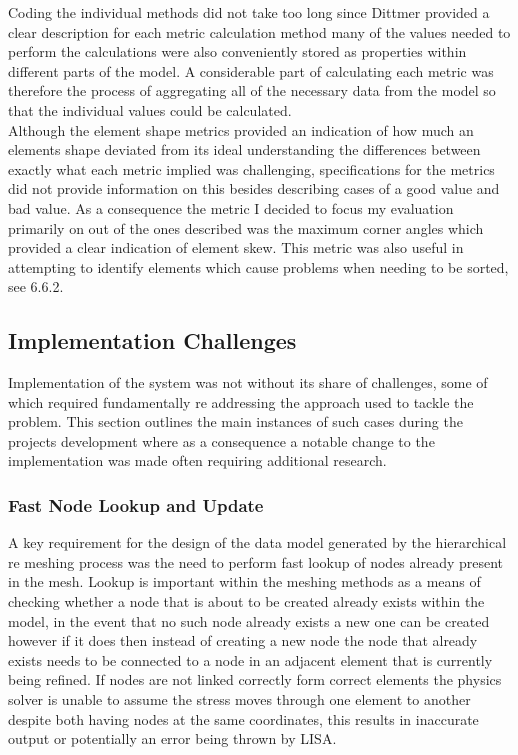 \noindent
Coding the individual methods did not take too long since Dittmer provided a clear description for each metric calculation method many of the values needed to perform the calculations were also conveniently stored as properties within different parts of the model. A considerable part of calculating each metric was therefore the process of aggregating all of the necessary data from the model so that the individual values could be calculated. \\ 

\noindent
Although the element shape metrics provided an indication of how much an elements shape deviated from its ideal understanding the differences between exactly what each metric implied was challenging, specifications for the metrics did not provide information on this besides describing cases of a good value and bad value. As a consequence the metric I decided to focus my evaluation primarily on out of the ones described was the maximum corner angles which provided a clear indication of element skew. This metric was also useful in attempting to identify elements which cause problems when needing to be sorted, see 6.6.2.




\subsection{Implementation Challenges}
Implementation of the system was not without its share of challenges, some of which required fundamentally re addressing the approach used to tackle the problem. This section outlines the main instances of such cases during the projects development where as a consequence a notable change to the implementation was made often requiring additional research.

\subsubsection{Fast Node Lookup and Update}
A key requirement for the design of the data model generated by the hierarchical re meshing process was the need to perform fast lookup of nodes already present in the mesh. Lookup is important within the meshing methods as a means of checking whether a node that is about to be created already exists within the model, in the event that no such node already exists a new one can be created however if it does then instead of creating a new node the node that already exists needs to be connected to a node in an adjacent element that is currently being refined. If nodes are not linked correctly form correct elements the physics solver is unable to assume the stress moves through one element to another despite both having nodes at the same coordinates, this results in inaccurate output or potentially an error being thrown by LISA. \\ 


